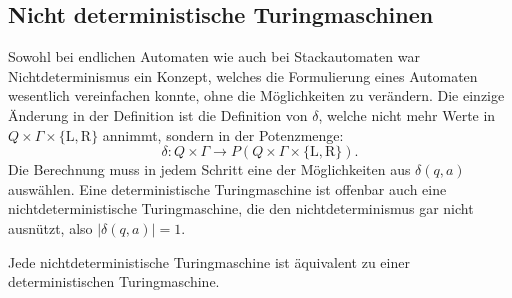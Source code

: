 \subsection{Nicht deterministische Turingmaschinen}
%
Sowohl bei endlichen Automaten wie auch bei Stackautomaten war
Nichtdeterminismus ein Konzept, welches die Formulierung eines
Automaten wesentlich vereinfachen konnte, ohne die Möglichkeiten
zu verändern. Die einzige Änderung in der Definition ist die
Definition von $\delta$, welche nicht mehr Werte in
$Q\times \Gamma\times\{\text{L},\text{R}\}$ annimmt, sondern
in der Potenzmenge:
\[
\delta\colon Q\times\Gamma\to
P(Q\times \Gamma\times\{\text{L},\text{R}\}).
\]
Die Berechnung muss in jedem Schritt eine der Möglichkeiten
aus $\delta(q,a)$ auswählen.
Eine deterministische Turingmaschine ist offenbar auch eine
nichtdeterministische Turingmaschine, die den nichtdeterminismus
gar nicht ausnützt, also $|\delta(q,a)|=1$.

\begin{satz}
\label{nichtdeterministischeturingmaschine}
Jede nichtdeterministische Turingmaschine ist äquivalent zu einer
deterministischen Turingmaschine.
\end{satz}

